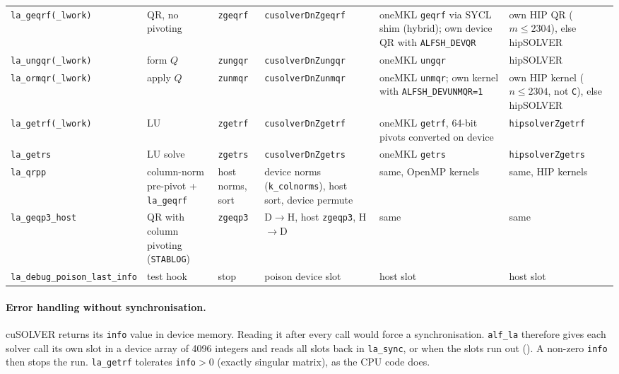 \begin{footnotesize}
\begin{longtable}{@{}>{\raggedright}p{2.5cm}>{\raggedright}p{2.5cm}>{\raggedright}p{2.1cm}>{\raggedright}p{2.8cm}>{\raggedright}p{2.8cm}>{\raggedright\arraybackslash}p{2.6cm}@{}}
\texttt{la\_geqrf(\_lwork)} & QR, no pivoting & \texttt{zgeqrf} & \texttt{cusolverDnZgeqrf} & oneMKL \texttt{geqrf} via SYCL shim (hybrid); own device QR with \texttt{ALFSH\_DEVQR} & own HIP QR ($m\le2304$), else hipSOLVER \\
\texttt{la\_ungqr(\_lwork)} & form $Q$ & \texttt{zungqr} & \texttt{cusolverDnZungqr} & oneMKL \texttt{ungqr} & hipSOLVER \\
\texttt{la\_ormqr(\_lwork)} & apply $Q$ & \texttt{zunmqr} & \texttt{cusolverDnZunmqr} & oneMKL \texttt{unmqr}; own kernel with \texttt{ALFSH\_DEVUNMQR=1} & own HIP kernel ($n\le2304$, not \texttt{C}), else hipSOLVER \\
\texttt{la\_getrf(\_lwork)} & LU & \texttt{zgetrf} & \texttt{cusolverDnZgetrf} & oneMKL \texttt{getrf}, 64-bit pivots converted on device & \texttt{hipsolverZgetrf} \\
\texttt{la\_getrs} & LU solve & \texttt{zgetrs} & \texttt{cusolverDnZgetrs} & oneMKL \texttt{getrs} & \texttt{hipsolverZgetrs} \\
\texttt{la\_qrpp} & column-norm pre-pivot + \texttt{la\_geqrf} & host norms, sort & device norms (\texttt{k\_colnorms}), host sort, device permute & same, OpenMP kernels & same, HIP kernels \\
\texttt{la\_geqp3\_host} & QR with column pivoting (\texttt{STABLOG}) & \texttt{zgeqp3} & D$\to$H, host \texttt{zgeqp3}, H$\to$D & same & same \\
\texttt{la\_debug\_poison\_last\_info} & test hook & stop & poison device slot & host slot & host slot \\
\bottomrule
\end{longtable}
\end{footnotesize}

\paragraph{Error handling without synchronisation.} cuSOLVER returns its \texttt{info} value in device memory. Reading it after every call would force a synchronisation. \texttt{alf\_la} therefore gives each solver call its own slot in a device array of 4096 integers and reads all slots back in \texttt{la\_sync}, or when the slots run out (). A non-zero \texttt{info} then stops the run. \texttt{la\_getrf} tolerates \texttt{info}$>0$ (exactly singular matrix), as the CPU code does.

